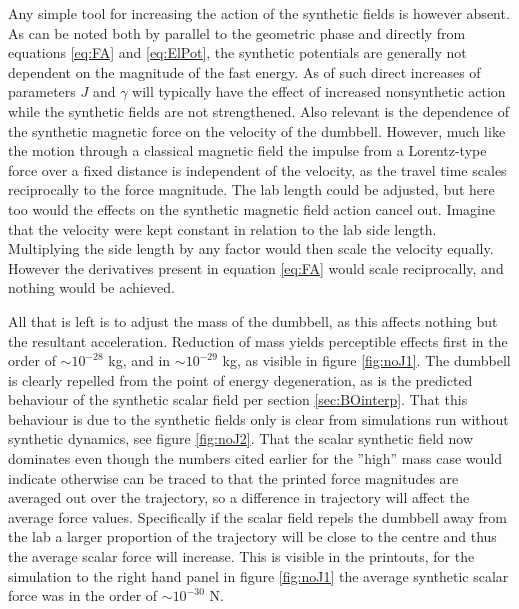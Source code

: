 \documentclass[main.tex]{subfiles}
\begin{document}
Any simple tool for increasing the action of the synthetic fields is however absent. As can
be noted both by parallel to the geometric phase and directly from equations \ref{eq:FA}
and \ref{eq:ElPot}, the synthetic potentials are generally not dependent on the magnitude of
the fast energy. As of such direct increases of parameters \(J\) and \(\gamma\) will typically
have the effect of increased nonsynthetic action while the synthetic fields are not
strengthened. Also relevant is the dependence of the synthetic magnetic force on the
velocity of the dumbbell. However, much like the motion through a classical magnetic field
the impulse from a Lorentz-type force over a fixed distance is independent of the velocity,
as the travel time scales reciprocally to the force magnitude. The lab length could be
adjusted, but here too would the effects on the synthetic magnetic field action cancel out.
Imagine that the velocity were kept constant in relation to the lab side length.
Multiplying the side length by any factor would then scale the velocity equally. However
the derivatives present in equation \ref{eq:FA} would scale reciprocally, and nothing would
be achieved.

All that is left is to adjust the mass of the dumbbell, as this affects nothing but
the resultant acceleration. Reduction of mass yields perceptible effects first
in the order of \(\sim 10^{-28}\) kg, and in \(\sim 10^{-29}\) kg, as visible in figure
\ref{fig:noJ1}. %
The dumbbell is clearly repelled from the point of energy degeneration, as is the predicted
behaviour of the synthetic scalar field per section \ref{sec:BOinterp}. That this behaviour
is due to the synthetic fields only is clear from simulations run without synthetic
dynamics, see figure \ref{fig:noJ2}. That the scalar synthetic field now dominates even
though the numbers cited earlier for the ''high'' mass case would indicate otherwise can be
traced to that the printed force magnitudes are averaged out over the trajectory, so a
difference in trajectory will affect the average force values. Specifically if the scalar
field repels the dumbbell away from the lab a larger proportion of the trajectory will be
close to the centre and thus the average scalar force will increase. This is visible in the
printouts, for the simulation to the right hand panel in figure \ref{fig:noJ1} the average synthetic scalar
force was in the order of \(\sim 10^{-30}\) N.
\end{document}
